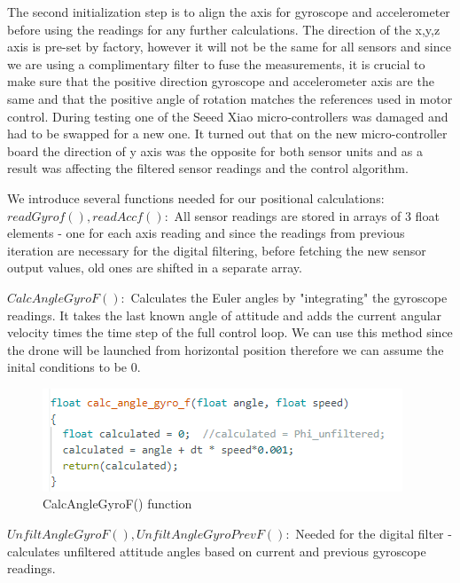 \begin{flushleft}
\begin{flushleft}
The second initialization step is to align the axis for gyroscope and accelerometer before using the readings for any further calculations.
The direction of the x,y,z axis is pre-set by factory, however it will not be the same for all sensors and since we are using a complimentary filter to fuse the measurements, it is crucial to make sure that the positive direction gyroscope and accelerometer axis are the same and that the positive angle of rotation matches the references used in motor control. \newline
During testing one of the Seeed Xiao micro-controllers was damaged and had to be swapped for a new one. It turned out that on the new micro-controller board the direction of y axis was the opposite for both sensor units and as a result was affecting the filtered sensor readings and the control algorithm. \newline

We introduce several functions needed for our positional calculations:
$readGyrof(), readAccf():$\newline
All sensor readings are stored in arrays of 3 float elements - one for each axis reading and since the readings from previous iteration are necessary for the digital filtering, before fetching the new sensor output values, old ones are shifted in a separate array.

$CalcAngleGyroF():$\newline
Calculates the Euler angles by "integrating" the gyroscope readings. It takes the last known angle of attitude and adds the current angular velocity times the time step of the full control loop. We can use this method since the drone will be launched from horizontal position therefore we can assume the inital conditions to be 0.

\begin{figure}[H]
    \begin{center}
    \includegraphics[scale = 0.85]{pictures/IMU/calc_angle_gyro.png}
    \end{center}
    \caption{CalcAngleGyroF() function}
    \label{fig:my_label}
\end{figure}

\begin{flushleft}
$UnfiltAngleGyroF(), UnfiltAngleGyroPrevF():$\newline
Needed for the digital filter - calculates unfiltered attitude angles based on current and previous gyroscope readings.


\end{flushleft}
\end{flushleft}
\end{flushleft}
